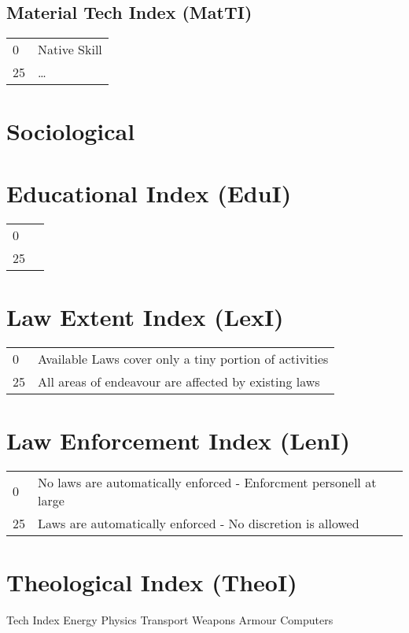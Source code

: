 \subsection{Material Tech Index (MatTI)}
\begin{tabular}{ll}
	0   & Native Skill \\
	25  & \dots \\
\end{tabular}

\section{Sociological}

\section{Educational Index (EduI)}
\begin{tabular}{ll}
	0   &  \\
	25  &  \\
\end{tabular}

\section{Law Extent Index (LexI)}
\begin{tabular}{ll}
	0    & Available Laws cover only a tiny portion of activities    \\
	25   & All areas of endeavour are affected by existing laws    \\
\end{tabular}

\section{Law Enforcement Index (LenI)}
\begin{tabular}{ll}
	0   & No laws are automatically enforced - Enforcment personell at large \\
	25  & Laws are automatically enforced - No discretion is allowed \\
\end{tabular}

\section{Theological Index     (TheoI)}


Tech 
Index	Energy          Physics			Transport	Weapons		Armour		Computers	

